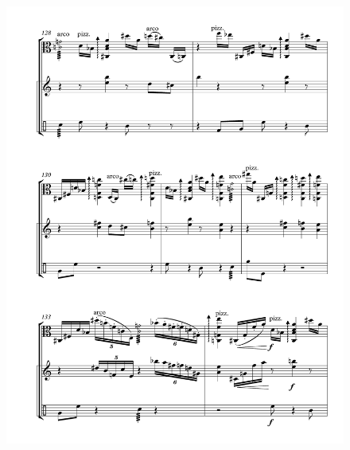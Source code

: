 \begin{figure}[htbp]
    \centering
	\includegraphics[width=6.5in]{figures/Viola_Percussion_18.pdf}
\end{figure}

